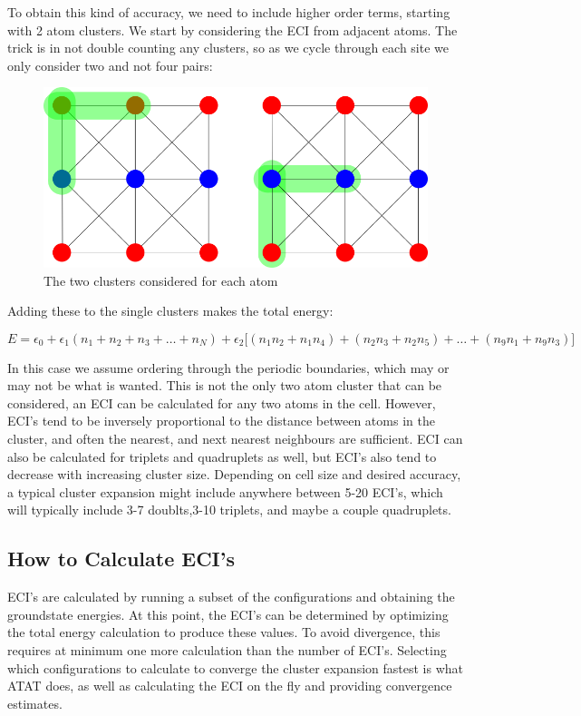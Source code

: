 \documentclass[12pt]{article}
\begin{document}
To obtain this kind of accuracy, we need to include higher order terms, starting with 2 atom clusters.  We start by considering the ECI from adjacent atoms. The trick is in not double counting any clusters, so as we cycle through each site we only consider two and not four pairs:  

\begin{figure}[H]
	\centering
	\includegraphics[scale=0.5]{./images/doublets.png}
	\caption*{The two clusters considered for each atom}
\end{figure}

Adding these to the single clusters makes the total energy: 

\[
E = \epsilon_0 + \epsilon_1 (n_1 + n_2 +n_3 + \dots + n_N ) + \epsilon_2 \bigg[(n_1n_2 + n_1n_4) + (n_2n_3 + n_2n_5) + \dots + (n_9n_1+n_9n_3)\bigg]
\]


In this case we assume ordering through the periodic boundaries, which may or may not be what is wanted. This is not the only two atom cluster that can be considered, an ECI can be calculated for any two atoms in the cell.  However, ECI's tend to be inversely proportional to the distance between atoms in the cluster, and often the nearest, and next nearest neighbours are sufficient.  ECI can also be calculated for triplets and quadruplets as well, but ECI's also tend to decrease with increasing cluster size.  Depending on cell size and desired accuracy, a typical cluster expansion might include anywhere between 5-20 ECI's, which will typically include 3-7 doublts,3-10 triplets, and maybe a couple quadruplets.  \\

\subsection{How to Calculate ECI's}
ECI's are calculated by running a subset of the configurations and obtaining the groundstate energies.  At this point, the ECI's can be determined by optimizing the total energy calculation to produce these values.  To avoid divergence, this requires at minimum one more calculation than the number of ECI's. Selecting which configurations to calculate to converge the cluster expansion fastest is what ATAT does, as well as calculating the ECI on the fly and providing convergence estimates.  \\
\end{document}
